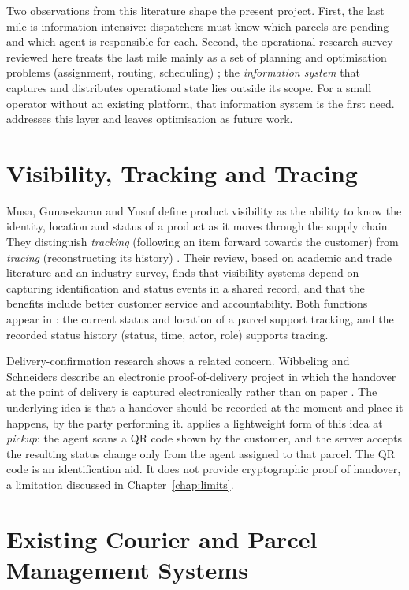Two observations from this literature shape the present project. First, the last mile is information-intensive: dispatchers must know which parcels are pending and which agent is responsible for each. Second, the operational-research survey reviewed here treats the last mile mainly as a set of planning and optimisation problems (assignment, routing, scheduling) \cite{boysen2021lastmile}; the \emph{information system} that captures and distributes operational state lies outside its scope. For a small operator without an existing platform, that information system is the first need. \scpms{} addresses this layer and leaves optimisation as future work.

\section{Visibility, Tracking and Tracing}
\label{sec:lit-visibility}

Musa, Gunasekaran and Yusuf define product visibility as the ability to know the identity, location and status of a product as it moves through the supply chain. They distinguish \emph{tracking} (following an item forward towards the customer) from \emph{tracing} (reconstructing its history) \cite{musa2014visibility}. Their review, based on academic and trade literature and an industry survey, finds that visibility systems depend on capturing identification and status events in a shared record, and that the benefits include better customer service and accountability. Both functions appear in \scpms: the current status and location of a parcel support tracking, and the recorded status history (status, time, actor, role) supports tracing.

Delivery-confirmation research shows a related concern. Wibbeling and Schneiders describe an electronic proof-of-delivery project in which the handover at the point of delivery is captured electronically rather than on paper \cite{wibbeling2013epod}. The underlying idea is that a handover should be recorded at the moment and place it happens, by the party performing it. \scpms{} applies a lightweight form of this idea at \emph{pickup}: the agent scans a QR code shown by the customer, and the server accepts the resulting status change only from the agent assigned to that parcel. The QR code is an identification aid. It does not provide cryptographic proof of handover, a limitation discussed in Chapter~\ref{chap:limits}.

\section{Existing Courier and Parcel Management Systems}
\label{sec:lit-systems}

